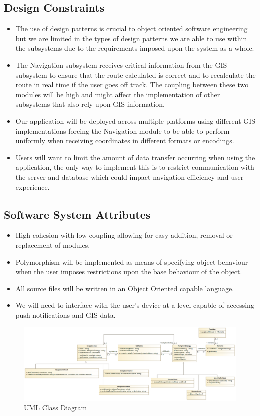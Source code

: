 \documentclass[a4paper,12pt]{article}
\begin{document}
	\subsection{Design Constraints}
	\begin{itemize}
		\small
		\item The use of design patterns is crucial to object oriented software engineering but we are limited 
			in the types of design patterns we are able to use within the subsystems due to the requirements 
			imposed upon the system as a whole.
		\item The Navigation subsystem receives critical information from the GIS subsystem to ensure that the route
			calculated is correct and to recalculate the route in real time if the user goes off track. The coupling between these two modules will be high and might affect the implementation of other subsystems that also rely upon GIS information.
		\item Our application will be deployed across multiple platforms using different GIS implementations forcing the Navigation module to be able to perform uniformly when receiving coordinates in different formats or encodings.
		\item Users will want to limit the amount of data transfer occurring when using the application, the only way to implement this is to restrict communication with the server and database which could impact navigation efficiency and user experience.
	\end{itemize}
	
	\subsection{Software System Attributes}
	\begin{itemize}
		\small 
		\item High cohesion with low coupling allowing for easy addition, removal or replacement of modules.
		\item Polymorphism will be implemented as means of specifying object behaviour when the user imposes restrictions upon the base behaviour of the object.
		\item All source files will be written in an Object Oriented capable language.
		\item We will need to interface with the user's device at a level capable of accessing push notifications and 
		 GIS data.
	\end{itemize}
	
	\begin{figure}
	  \includegraphics[width=\linewidth]{NavigationModuleClassDiagram.png}
	  \caption{UML Class Diagram}
	  \label{fig:UML1}
	\end{figure}
	
\end{document}
